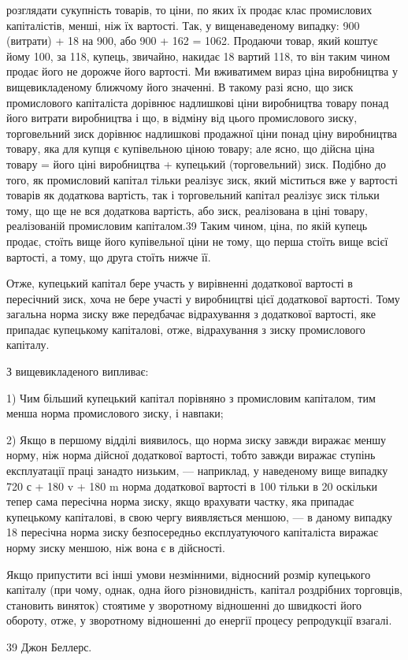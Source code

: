 розглядати сукупність товарів, то ціни, по яких їх продає клас
промислових капіталістів, менші, ніж їх вартості. Так, у вищенаведеному випадку: 900 (витрати) + 18%
на 900, або 900 + 162 =
1062. Продаючи товар, який коштує йому 100, за 118, купець, звичайно,
накидає 18%
вартий 118, то він таким чином продає його не дорожче його
вартості. Ми вживатимем вираз ціна виробництва у вищевикладеному
ближчому його значенні. В такому разі ясно, що зиск
промислового капіталіста дорівнює надлишкові ціни виробництва
товару понад його витрати виробництва і що, в відміну від цього
промислового зиску, торговельний зиск дорівнює надлишкові
продажної ціни понад ціну виробництва товару, яка для купця
є купівельною ціною товару; але ясно, що дійсна ціна товару =
його ціні виробництва + купецький (торговельний) зиск. Подібно
до того, як промисловий капітал тільки реалізує зиск, який міститься
вже у вартості товарів як додаткова вартість, так і торговельний
капітал реалізує зиск тільки тому, що ще не вся
додаткова вартість, або зиск, реалізована в ціні товару, реалізованій
промисловим капіталом.39 Таким чином, ціна, по якій купець
продає, стоїть вище його купівельної ціни не тому, що
перша стоїть вище всієї вартості, а тому, що друга стоїть нижче її.

Отже, купецький капітал бере участь у вирівненні додаткової
вартості в пересічний зиск, хоча не бере участі у виробництві
цієї додаткової вартості. Тому загальна норма зиску вже
передбачає відрахування з додаткової вартості, яке припадає купецькому
капіталові, отже, відрахування з зиску промислового
капіталу.

З вищевикладеного випливає:

1) Чим більший купецький капітал порівняно з промисловим
капіталом, тим менша норма промислового зиску, і навпаки;

2) Якщо в першому відділі виявилось, що норма зиску завжди
виражає меншу норму, ніж норма дійсної додаткової вартості,
тобто завжди виражає ступінь експлуатації праці занадто низьким,
— наприклад, у наведеному вище випадку 720 с + 180 v + 180 m
норма додаткової вартості в 100%
тільки в 20%
оскільки тепер сама пересічна норма зиску, якщо врахувати
частку, яка припадає купецькому капіталові, в свою чергу виявляється
меншою, — в даному випадку 18%
пересічна норма зиску безпосередньо експлуатуючого капіталіста
виражає норму зиску меншою, ніж вона є в дійсності.

Якщо припустити всі інші умови незмінними, відносний розмір
купецького капіталу (при чому, однак, одна його різновидність,
капітал роздрібних торговців, становить виняток) стоятиме
у зворотному відношенні до швидкості його обороту, отже,
у зворотному відношенні до енергії процесу репродукції взагалі.

39 Джон Беллерс.
